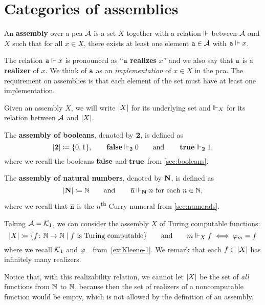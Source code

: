 \chapter{Categories of assemblies}\label{chap:assemblies}


\begin{definition}[Assembly]
  An \textbf{assembly} over a pca \(\AA\) is a set \(X\) together with a
  relation \({\realizes}\) between \(\AA\) and \(X\) such that for all
  \(x \in X\), there exists at least one element \(\pca{a} \in \AA\) with
  \(\pca{a} \realizes x\).
\end{definition}

The relation \(\pca{a} \realizes x\) is pronounced as ``\(\pca{a}\)
\textbf{realizes} \(x\)'' and we also say that \(\pca{a}\) is a
\textbf{realizer} of \(x\). We think of \(\pca{a}\) as an \emph{implementation}
of \(x \in X\) in the pca.
%
The requirement on assemblies is that each element of the set must have at least
one implementation.

\begin{notation}
  Given an assembly \(X\), we will write \(\carrier{X}\) for its underlying set
  and \(\realizes_X\) for its relation between \(\AA\) and \(\carrier{X}\).
\end{notation}

\begin{example}\label{ex:assembly-of-booleans}
  The \textbf{assembly of booleans}, denoted by \(\Two\), is defined as
  \[
    \carrier{\Two} \coloneqq \set{0,1},
    \quad\quad
    \pcafalse \realizes_\Two 0
    \quad\quad
    \text{and}\quad\quad
    \pcatrue \realizes_\Two 1,
  \]
  where we recall the booleans \(\pcafalse\) and \(\pcatrue\) from \cref{sec:booleans}.
\end{example}

\begin{example}\label{ex:NatAsm}
  The \textbf{assembly of natural numbers}, denoted by \(\NatAsm\), is defined as
  \[
    \carrier{\NatAsm} \coloneqq \Nat
    \quad\quad\text{and}\quad\quad
    \numeral{n} \realizes_\NatAsm n \text{ for each \(n \in \Nat\)},
  \]
  where we recall that \(\numeral{n}\) is the \(n\)\textsuperscript{th} Curry
  numeral from \cref{sec:numerals}.
\end{example}

\begin{example}
  Taking \(\AA = \Kone\), we can consider the assembly \(X\) of Turing computable functions:
  \[
    \carrier{X} \coloneqq \set{f \colon \Nat \to \Nat \mid f \text{ is Turing computable}}
    \quad\quad\text{and}\quad\quad
    m \realizes_X f \iff \prenum{m} = f
  \]
  where we recall \(\Kone\) and \(\prenum{-}\) from~\cref{ex:Kleene-1}.
  We remark that each \(f \in \carrier{X}\) has infinitely many realizers.

  Notice that, with this realizability relation, we cannot let \(\carrier{X}\)
  be the set of \emph{all} functions from \(\Nat\) to \(\Nat\), because then the
  set of realizers of a noncomputable function would be empty, which is not
  allowed by the definition of an assembly.
\end{example}

